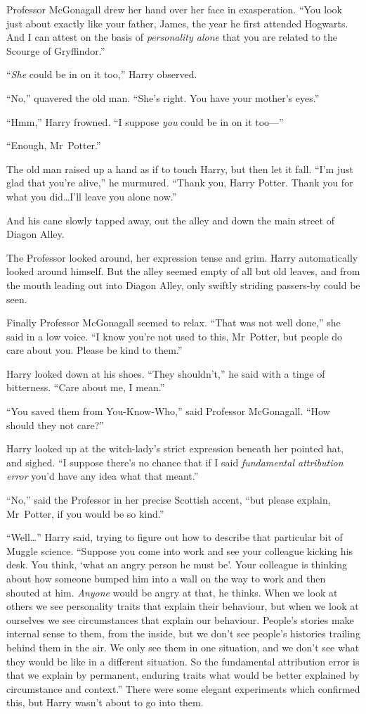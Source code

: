 Professor McGonagall drew her hand over her face in exasperation. “You look just about exactly like your father, James, the year he first attended Hogwarts. And I can attest on the basis of \emph{personality alone} that you are related to the Scourge of Gryffindor.”

“\emph{She} could be in on it too,” Harry observed.

“No,” quavered the old man. “She’s right. You have your mother’s eyes.”

“Hmm,” Harry frowned. “I suppose \emph{you} could be in on it too—”

“Enough, Mr~Potter.”

The old man raised up a hand as if to touch Harry, but then let it fall. “I’m just glad that you’re alive,” he murmured. “Thank you, Harry Potter. Thank you for what you did…I’ll leave you alone now.”

And his cane slowly tapped away, out the alley and down the main street of Diagon Alley.

The Professor looked around, her expression tense and grim. Harry automatically looked around himself. But the alley seemed empty of all but old leaves, and from the mouth leading out into Diagon Alley, only swiftly striding passers-by could be seen.

Finally Professor McGonagall seemed to relax. “That was not well done,” she said in a low voice. “I know you’re not used to this, Mr~Potter, but people do care about you. Please be kind to them.”

Harry looked down at his shoes. “They shouldn’t,” he said with a tinge of bitterness. “Care about me, I mean.”

“You saved them from You-Know-Who,” said Professor McGonagall. “How should they not care?”

Harry looked up at the witch-lady’s strict expression beneath her pointed hat, and sighed. “I suppose there’s no chance that if I said \emph{fundamental attribution error} you’d have any idea what that meant.”

“No,” said the Professor in her precise Scottish accent, “but please explain, Mr~Potter, if you would be so kind.”

“Well…” Harry said, trying to figure out how to describe that particular bit of Muggle science. “Suppose you come into work and see your colleague kicking his desk. You think, ‘what an angry person he must be’. Your colleague is thinking about how someone bumped him into a wall on the way to work and then shouted at him. \emph{Anyone} would be angry at that, he thinks. When we look at others we see personality traits that explain their behaviour, but when we look at ourselves we see circumstances that explain our behaviour. People’s stories make internal sense to them, from the inside, but we don’t see people’s histories trailing behind them in the air. We only see them in one situation, and we don’t see what they would be like in a different situation. So the fundamental attribution error is that we explain by permanent, enduring traits what would be better explained by circumstance and context.” There were some elegant experiments which confirmed this, but Harry wasn’t about to go into them.

